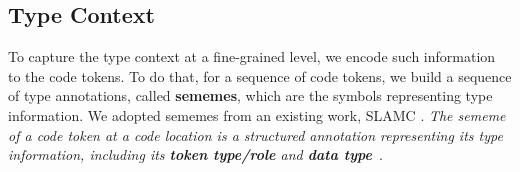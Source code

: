 \subsection{Type Context}
\label{sememesec}

%

%






To capture the type context at a fine-grained level, we encode
such information to the code tokens.
%
To do that, for a sequence of code tokens, we build a sequence of
type annotations, called {\bf sememes}, which are the symbols
representing type information. We adopted sememes from an existing
work, SLAMC \cite{fse13}.
%
{\em The \emph{sememe} of a code token at a code location is a
  structured annotation representing its type information,
  including its {\bf token type/role} and {\bf data type}}~\cite{fse13}.

